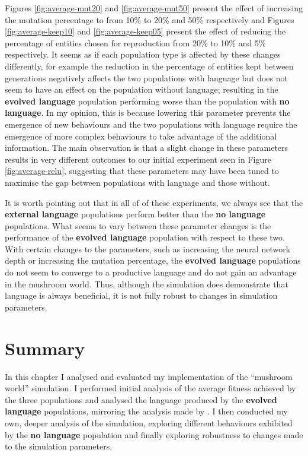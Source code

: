 \documentclass[12pt,a4paper,twoside,openright]{report}
\begin{document}
Figures \ref{fig:average-mut20} and \ref{fig:average-mut50} present the effect of increasing the mutation percentage to from 10\% to 20\% and 50\% respectively and Figures \ref{fig:average-keep10} and \ref{fig:average-keep05} present the effect of reducing the percentage of entities chosen for reproduction from 20\% to 10\% and 5\% respectively. It seems as if each population type is affected by these changes differently, for example the reduction in the percentage of entities kept between generations negatively affects the two populations with language but does not seem to have an effect on the population without language; resulting in the {\bf evolved language} population performing worse than the population with {\bf no language}. In my opinion, this is because lowering this parameter prevents the emergence of new behaviours and the two populations with language require the emergence of more complex behaviours to take advantage of the additional information. The main observation is that a slight change in these parameters results in very different outcomes to our initial experiment seen in Figure \ref{fig:average-relu}, suggesting that these parameters may have been tuned to maximise the gap between populations with language and those without.

It is worth pointing out that in all of of these experiments, we always see that the {\bf external language} populations perform better than the {\bf no language} populations. What seems to vary between these parameter changes is the performance of the {\bf evolved language} population with respect to these two. With certain changes to the parameters, such as increasing the neural network depth or increasing the mutation percentage, the {\bf evolved language} populations do not seem to converge to a productive language and do not gain an advantage in the mushroom world. Thus, although the simulation does demonstrate that language is always beneficial, it is not fully robust to changes in simulation parameters.

 \section{Summary}
 
 In this chapter I analysed and evaluated my implementation of the ``mushroom world'' simulation. I performed initial analysis of the average fitness achieved by the three populations and analysed the language produced by the {\bf evolved language} populations, mirroring the analysis made by \citet{Cangelosi1998}. I then conducted my own, deeper analysis of the simulation, exploring different behaviours exhibited by the {\bf no language} population and finally exploring robustness to changes made to the simulation parameters.
\end{document}
